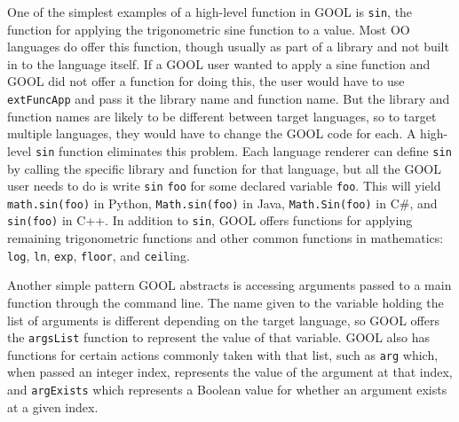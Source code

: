 \documentclass[sigplan,review,anonymous]{acmart}
\begin{document}
One of the simplest examples of a high-level function in GOOL is \verb|sin|, 
the function for applying the trigonometric sine function to a value. Most OO 
languages do offer this function, though usually as part of a library and not 
built in to the language itself. If a GOOL user wanted to apply a sine function 
and GOOL did not offer a function for doing this, the user would have to use 
\verb|extFuncApp| and pass it the library name and function name. But the 
library and function names are likely to be different between target languages, 
so to target multiple languages, they would have to change the GOOL 
code for each. A high-level \verb|sin| function eliminates this problem. Each 
language renderer can define \verb|sin| by calling the specific library and 
function for that language, but all the GOOL user needs to do is write 
\verb|sin| \verb|foo| for some declared variable \verb|foo|. This will 
yield \verb|math.sin(foo)| in Python, \verb|Math.sin(foo)| in Java, 
\verb|Math.Sin(foo)| in C\#, and \verb|sin(foo)| in C++. In addition to 
\verb|sin|, GOOL offers functions for applying remaining trigonometric 
functions and other common functions in mathematics: \verb|log|, \verb|ln|, 
\verb|exp|, \verb|floor|, and \verb|ceil|ing.

Another simple pattern GOOL abstracts is accessing arguments passed to a main 
function through the command line. The name given to the variable holding the 
list of arguments is different depending on the target language, so GOOL offers 
the \verb|argsList| function to represent the value of that variable. GOOL 
also has functions for certain actions commonly taken with that list, such as 
\verb|arg| which, when passed an integer index, represents the value of the 
argument at that index, and \verb|argExists| which represents a Boolean value 
for whether an argument exists at a given index.
\end{document}
